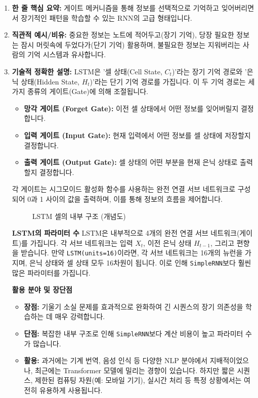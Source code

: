 \documentclass[11pt,a4paper]{article}
\theoremstyle{definition}
\begin{document}
\begin{enumerate}
    \item \textbf{한 줄 핵심 요약:} 게이트 메커니즘을 통해 정보를 선택적으로 기억하고 잊어버리면서 장기적인 패턴을 학습할 수 있는 RNN의 고급 형태입니다.
    \item \textbf{직관적 예시/비유:} 중요한 정보는 노트에 적어두고(장기 기억), 당장 필요한 정보는 잠시 머릿속에 두었다가(단기 기억) 활용하며, 불필요한 정보는 지워버리는 사람의 기억 시스템과 유사합니다.
    \item \textbf{기술적 정확한 설명:}
    LSTM은 '셀 상태(Cell State, $C_t$)'라는 장기 기억 경로와 '은닉 상태(Hidden State, $H_t$)'라는 단기 기억 경로를 가집니다. 이 두 기억 경로는 세 가지 종류의 게이트(Gate)에 의해 조절됩니다.
    \begin{itemize}
        \item \textbf{망각 게이트 (Forget Gate):} 이전 셀 상태에서 어떤 정보를 잊어버릴지 결정합니다.
        \item \textbf{입력 게이트 (Input Gate):} 현재 입력에서 어떤 정보를 셀 상태에 저장할지 결정합니다.
        \item \textbf{출력 게이트 (Output Gate):} 셀 상태의 어떤 부분을 현재 은닉 상태로 출력할지 결정합니다.
    \end{itemize}
    각 게이트는 시그모이드 활성화 함수를 사용하는 완전 연결 서브 네트워크로 구성되어 0과 1 사이의 값을 출력하며, 이를 통해 정보의 흐름을 제어합니다.

    \begin{figure}[h!]
    \centering
    \caption{LSTM 셀의 내부 구조 (개념도)}
    \label{fig:lstm_cell}
    \end{figure}

    \begin{tipbox}
    \textbf{LSTM의 파라미터 수}
    LSTM은 내부적으로 4개의 완전 연결 서브 네트워크(게이트)를 가집니다. 각 서브 네트워크는 입력 $X_t$, 이전 은닉 상태 $H_{t-1}$, 그리고 편향을 받습니다.
    만약 \texttt{LSTM(units=16)}이라면, 각 서브 네트워크는 16개의 뉴런을 가지며, 은닉 상태와 셀 상태 모두 16차원이 됩니다. 이로 인해 \texttt{SimpleRNN}보다 훨씬 많은 파라미터를 가집니다.
    \end{tipbox}

    \textbf{활용 분야 및 장단점}
    \begin{itemize}
        \item \textbf{장점:} 기울기 소실 문제를 효과적으로 완화하여 긴 시퀀스의 장기 의존성을 학습하는 데 매우 강력합니다.
        \item \textbf{단점:} 복잡한 내부 구조로 인해 \texttt{SimpleRNN}보다 계산 비용이 높고 파라미터 수가 많습니다.
        \item \textbf{활용:} 과거에는 기계 번역, 음성 인식 등 다양한 NLP 분야에서 지배적이었으나, 최근에는 Transformer 모델에 밀리는 경향이 있습니다. 하지만 짧은 시퀀스, 제한된 컴퓨팅 자원(예: 모바일 기기), 실시간 처리 등 특정 상황에서는 여전히 유용하게 사용됩니다.
    \end{itemize}
\end{enumerate}
\end{document}
